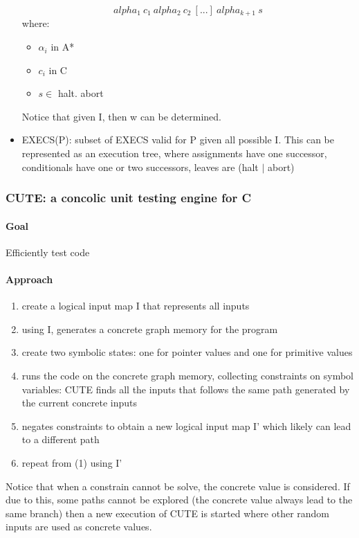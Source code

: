 \begin{itemize}
    \[ alpha_1~c_1~alpha_2~c_2~[...]~alpha_{k+1}~s \]
    where:
      \begin{itemize}
        \item $\alpha_i$ in A*
        \item $c_i$ in C
        \item $s \in$ {halt. abort}
      \end{itemize}
      Notice that given I, then w can be determined.
    \item EXECS(P): subset of EXECS valid for P given all possible I. This can be represented as an execution tree, where assignments have one successor, conditionals have one or two successors, leaves are (halt $|$ abort)

\end{itemize}

\subsubsection{\cite{CUTE-FSE13} CUTE: a concolic unit testing engine for C} 

\paragraph{Goal}
Efficiently test code

\paragraph{Approach}

\begin{enumerate}
  \item create a logical input map I that represents all inputs
  \item using I, generates a concrete graph memory for the program
  \item create two symbolic states: one for pointer values and one for primitive values
  \item runs the code on the concrete graph memory, collecting constraints on symbol variables: CUTE finds all the inputs that follows the same path generated by the current concrete inputs
  \item negates constraints to obtain a new logical input map I' which likely can lead to a different path
  \item repeat from (1) using I'
\end{enumerate}


Notice that when a constrain cannot be solve, the concrete value is considered. If due to this, some paths cannot be explored (the concrete value always lead to the same branch) then a new execution of CUTE is started where other random inputs are used as concrete values.

